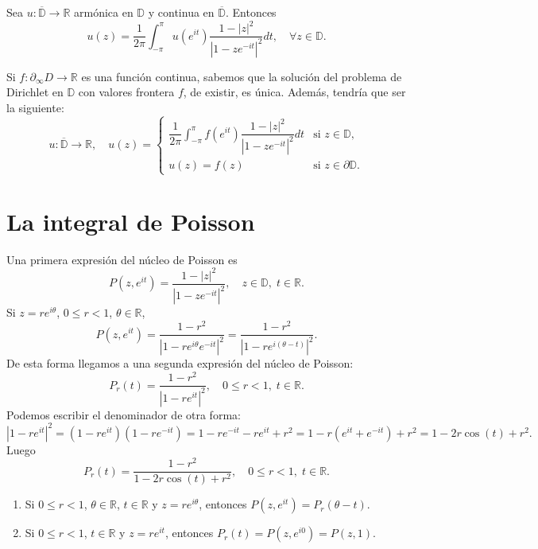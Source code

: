 \begin{theorem}
    Sea $u: \overline{\mathbb{D}} \to \mathbb{R}$ armónica en $\mathbb{D}$ y continua en $\overline{\mathbb{D}}$.
    Entonces
    $$u(z) = \frac{1}{2\pi} \int_{-\pi}^\pi u(e^{it})\frac{1-|z|^2}{|1-ze^{-it}|^2}dt, \quad \forall z \in \mathbb{D}.$$
\end{theorem}

Si $f: \partial_\infty D \to \mathbb{R}$ es una función continua, sabemos que la solución del problema de Dirichlet en $\mathbb{D}$ con valores frontera $f$, de existir, es única.
Además, tendría que ser la siguiente:
$$u: \overline{\mathbb{D}} \to \mathbb{R}, \quad
    u(z) = \begin{cases}
        \dfrac{1}{2\pi} \int_{-\pi}^\pi f(e^{it})\dfrac{1-|z|^2}{|1-ze^{-it}|^2}dt & \text{si } z \in \mathbb{D},         \\
        u(z) = f(z)                                                                & \text{si } z \in \partial\mathbb{D}.
    \end{cases}$$

\section{La integral de Poisson}
Una primera expresión del núcleo de Poisson es
$$P(z, e^{it}) = \frac{1-|z|^2}{|1-ze^{-it}|^2}, \quad z \in \mathbb{D}, \; t \in \mathbb{R}.$$
Si $z = re^{i\theta}$, $0 \leq r < 1$, $\theta \in \mathbb{R}$,
$$P(z, e^{it}) = \frac{1-r^2}{|1-re^{i\theta}e^{-it}|^2} = \frac{1-r^2}{|1-re^{i(\theta-t)}|^2}.$$
De esta forma llegamos a una segunda expresión del núcleo de Poisson:
$$P_r(t) = \frac{1-r^2}{|1-re^{it}|^2}, \quad 0 \leq r < 1, \; t \in \mathbb{R}.$$
Podemos escribir el denominador de otra forma:
$$|1-re^{it}|^2 = (1-re^{it})(1-re^{-it}) = 1 - re^{-it} - re^{it} + r^2 = 1 - r(e^{it}+e^{-it}) + r^2 = 1 - 2r\cos(t) + r^2.$$
Luego
$$P_r(t) = \frac{1-r^2}{1 - 2r\cos(t) + r^2}, \quad 0 \leq r < 1, \; t \in \mathbb{R}.$$

\begin{remark}
    \hfill
    \begin{enumerate}
        \item Si $0 \leq r < 1$, $\theta \in \mathbb{R}$, $t \in \mathbb{R}$ y $z = re^{i\theta}$, entonces $P(z, e^{it}) = P_r(\theta-t)$.
        \item Si $0 \leq r < 1$, $t \in \mathbb{R}$ y $z = re^{it}$, entonces $P_r(t) = P(z, e^{i0}) = P(z, 1)$.
    \end{enumerate}
\end{remark}

